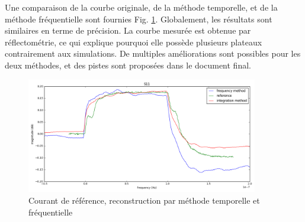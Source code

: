 Une comparaison de la courbe originale, de la méthode temporelle, et de la méthode fréquentielle sont fournies Fig. \ref{fig:freq-domain-reconstructed}.
Globalement, les résultats sont similaires en terme de précision.
La courbe mesurée est obtenue par réflectométrie, ce qui explique pourquoi elle possède plusieurs plateaux contrairement aux simulations.
De multiples améliorations sont possibles pour les deux méthodes, et des pistes sont proposées dans le document final.

\begin{figure}[!h]
  \centering
  \includegraphics[width=0.9\textwidth]{src/1/figures/final_comparison_reconstructions.png}
  \caption{Courant de référence, reconstruction par méthode temporelle et fréquentielle}
  \label{fig:freq-domain-reconstructed}
\end{figure}
